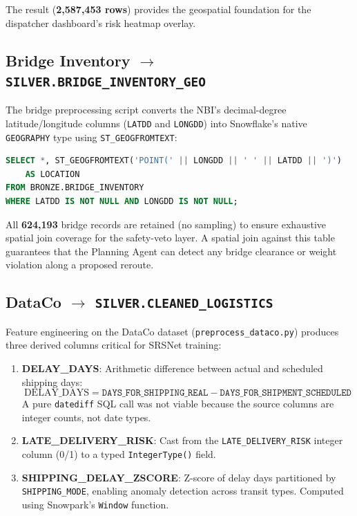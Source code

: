 \documentclass[14.5pt,letterpaper]{article}
\begin{document}
The result (\textbf{2,587,453 rows}) provides the geospatial foundation for the dispatcher dashboard's risk heatmap overlay.

\subsection{Bridge Inventory $\rightarrow$ \texttt{SILVER.BRIDGE\_INVENTORY\_GEO}}

The bridge preprocessing script converts the NBI's decimal-degree latitude/longitude columns (\texttt{LATDD} and \texttt{LONGDD}) into Snowflake's native \texttt{GEOGRAPHY} type using \texttt{ST\_GEOGFROMTEXT}:

\begin{lstlisting}[language=SQL, caption={GEOGRAPHY conversion for spatial join support}]
SELECT *, ST_GEOGFROMTEXT('POINT(' || LONGDD || ' ' || LATDD || ')') 
    AS LOCATION
FROM BRONZE.BRIDGE_INVENTORY
WHERE LATDD IS NOT NULL AND LONGDD IS NOT NULL;
\end{lstlisting}

All \textbf{624,193} bridge records are retained (no sampling) to ensure exhaustive spatial join coverage for the safety-veto layer. A spatial join against this table guarantees that the Planning Agent can detect any bridge clearance or weight violation along a proposed reroute.

\subsection{DataCo $\rightarrow$ \texttt{SILVER.CLEANED\_LOGISTICS}}

Feature engineering on the DataCo dataset (\texttt{preprocess\_dataco.py}) produces three derived columns critical for SRSNet training:

\begin{enumerate}
    \item \textbf{DELAY\_DAYS}: Arithmetic difference between actual and scheduled shipping days:
    \[
        \text{DELAY\_DAYS} = \texttt{DAYS\_FOR\_SHIPPING\_REAL} - \texttt{DAYS\_FOR\_SHIPMENT\_SCHEDULED}
    \]
    A pure \texttt{datediff} SQL call was not viable because the source columns are integer counts, not date types.

    \item \textbf{LATE\_DELIVERY\_RISK}: Cast from the \texttt{LATE\_DELIVERY\_RISK} integer column (0/1) to a typed \texttt{IntegerType()} field.

    \item \textbf{SHIPPING\_DELAY\_ZSCORE}: Z-score of delay days partitioned by \texttt{SHIPPING\_MODE}, enabling anomaly detection across transit types. Computed using Snowpark's \texttt{Window} function.
\end{enumerate}
\end{document}
